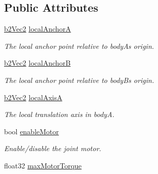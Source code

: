 \subsection*{Public Attributes}
\begin{DoxyCompactItemize}
\item 
\mbox{\label{structb2WheelJointDef_a9429d2273bfdd8bdc0db416e73b89ae4}} 
\hyperlink{structb2Vec2}{b2\+Vec2} \hyperlink{structb2WheelJointDef_a9429d2273bfdd8bdc0db416e73b89ae4}{local\+AnchorA}
\begin{DoxyCompactList}\small\item\em The local anchor point relative to bodyA\textquotesingle{}s origin. \end{DoxyCompactList}\item 
\mbox{\label{structb2WheelJointDef_a88ba0f7108076b9d7ced68425be95c27}} 
\hyperlink{structb2Vec2}{b2\+Vec2} \hyperlink{structb2WheelJointDef_a88ba0f7108076b9d7ced68425be95c27}{local\+AnchorB}
\begin{DoxyCompactList}\small\item\em The local anchor point relative to bodyB\textquotesingle{}s origin. \end{DoxyCompactList}\item 
\mbox{\label{structb2WheelJointDef_ad635ee7b77b50037dc0e021a0f5c93a6}} 
\hyperlink{structb2Vec2}{b2\+Vec2} \hyperlink{structb2WheelJointDef_ad635ee7b77b50037dc0e021a0f5c93a6}{local\+AxisA}
\begin{DoxyCompactList}\small\item\em The local translation axis in bodyA. \end{DoxyCompactList}\item 
\mbox{\label{structb2WheelJointDef_a8e7193d6c34c784ffd71e79d3a70acc6}} 
bool \hyperlink{structb2WheelJointDef_a8e7193d6c34c784ffd71e79d3a70acc6}{enable\+Motor}
\begin{DoxyCompactList}\small\item\em Enable/disable the joint motor. \end{DoxyCompactList}\item 
\mbox{\label{structb2WheelJointDef_ab658ce0fae40c6de09133659f7ffb829}} 
float32 \hyperlink{structb2WheelJointDef_ab658ce0fae40c6de09133659f7ffb829}{max\+Motor\+Torque}

\end{DoxyCompactItemize}
